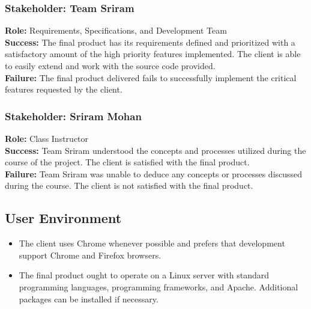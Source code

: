 \documentclass{article}
\begin{document}
\subsubsection{Stakeholder: Team Sriram}
\textbf{Role:} Requirements, Specifications, and Development Team\\
\textbf{Success:} The final product has its requirements defined and prioritized with a satisfactory amount of the high priority features implemented.  The client is able to easily extend and work with the source code provided.\\
\textbf{Failure:} The final product delivered fails to successfully implement the critical features requested by the client.

\subsubsection{Stakeholder: Sriram Mohan}
\textbf{Role:} Class Instructor\\
\textbf{Success:} Team Sriram understood the concepts and processes utilized during the course of the project. The client is satisfied with the final product.\\
\textbf{Failure:} Team Sriram was unable to deduce any concepts or processes discussed during the course. The client is not satisfied with the final product.

\subsection{User Environment}
\begin{itemize}
\item The client uses Chrome whenever possible and prefers that development support Chrome and Firefox browsers.
\item The final product ought to operate on a Linux server with standard programming languages, programming frameworks, and Apache.  Additional packages can be installed if necessary.
\end{itemize}
\end{document}
